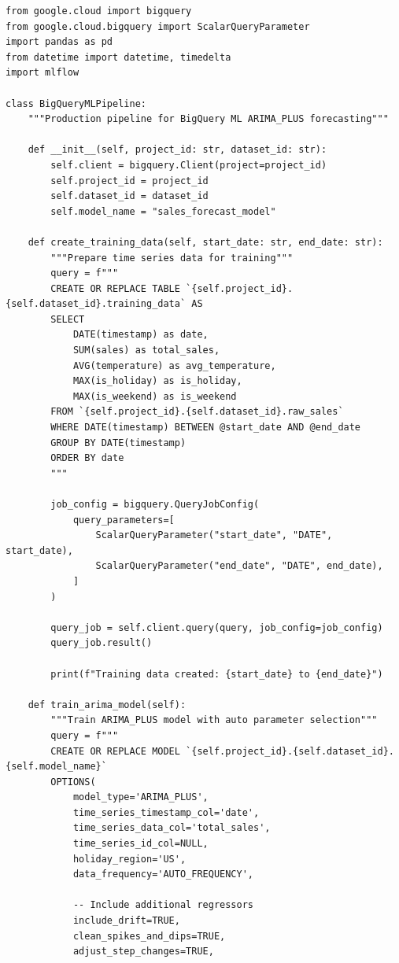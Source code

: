 \begin{lstlisting}[style=python, caption=BigQuery ML ARIMA\_PLUS automated forecasting pipeline]
from google.cloud import bigquery
from google.cloud.bigquery import ScalarQueryParameter
import pandas as pd
from datetime import datetime, timedelta
import mlflow

class BigQueryMLPipeline:
    """Production pipeline for BigQuery ML ARIMA_PLUS forecasting"""

    def __init__(self, project_id: str, dataset_id: str):
        self.client = bigquery.Client(project=project_id)
        self.project_id = project_id
        self.dataset_id = dataset_id
        self.model_name = "sales_forecast_model"

    def create_training_data(self, start_date: str, end_date: str):
        """Prepare time series data for training"""
        query = f"""
        CREATE OR REPLACE TABLE `{self.project_id}.{self.dataset_id}.training_data` AS
        SELECT
            DATE(timestamp) as date,
            SUM(sales) as total_sales,
            AVG(temperature) as avg_temperature,
            MAX(is_holiday) as is_holiday,
            MAX(is_weekend) as is_weekend
        FROM `{self.project_id}.{self.dataset_id}.raw_sales`
        WHERE DATE(timestamp) BETWEEN @start_date AND @end_date
        GROUP BY DATE(timestamp)
        ORDER BY date
        """

        job_config = bigquery.QueryJobConfig(
            query_parameters=[
                ScalarQueryParameter("start_date", "DATE", start_date),
                ScalarQueryParameter("end_date", "DATE", end_date),
            ]
        )

        query_job = self.client.query(query, job_config=job_config)
        query_job.result()

        print(f"Training data created: {start_date} to {end_date}")

    def train_arima_model(self):
        """Train ARIMA_PLUS model with auto parameter selection"""
        query = f"""
        CREATE OR REPLACE MODEL `{self.project_id}.{self.dataset_id}.{self.model_name}`
        OPTIONS(
            model_type='ARIMA_PLUS',
            time_series_timestamp_col='date',
            time_series_data_col='total_sales',
            time_series_id_col=NULL,
            holiday_region='US',
            data_frequency='AUTO_FREQUENCY',

            -- Include additional regressors
            include_drift=TRUE,
            clean_spikes_and_dips=TRUE,
            adjust_step_changes=TRUE,


\end{lstlisting}
